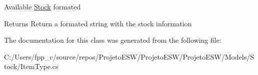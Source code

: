 Available \mbox{\hyperlink{namespace_projeto_e_s_w_1_1_models_1_1_stock}{Stock}} formated

\begin{DoxyReturn}{Returns}
Return a formated string with the stock information
\end{DoxyReturn}


The documentation for this class was generated from the following file\+:\begin{DoxyCompactItemize}
\item 
C\+:/\+Users/fpp\+\_\+c/source/repos/\+Projeto\+E\+S\+W/\+Projeto\+E\+S\+W/\+Projeto\+E\+S\+W/\+Models/\+Stock/Item\+Type.\+cs\end{DoxyCompactItemize}
